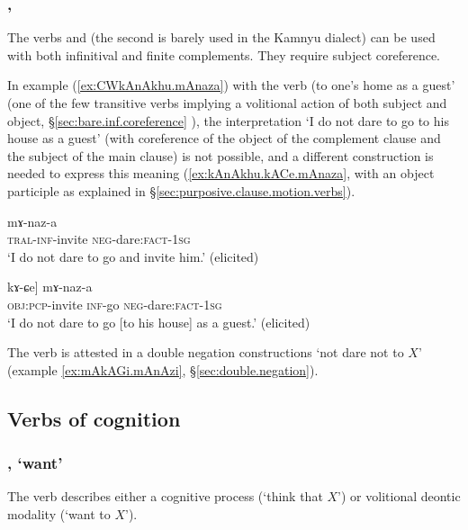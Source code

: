  \subsubsection{, }  \label{sec:nAz.verb}
 The verbs  and  (the second is barely used in the Kamnyu dialect) can be used with both infinitival and finite complements. They require subject coreference. 
 
 
In example (\ref{ex:CWkAnAkhu.mAnaza})  with the verb  (to one's home as a guest' (one of the few transitive verbs implying a volitional action of both subject and object, §\ref{sec:bare.inf.coreference} ), the interpretation `I do not dare to go to his house as a guest' (with coreference of the object of the complement clause and the subject of the main clause) is not possible, and a different construction is needed to express this meaning (\ref{ex:kAnAkhu.kACe.mAnaza}, with an object participle as explained in §\ref{sec:purposive.clause.motion.verbs}).

\begin{exe}
\ex \label{ex:CWkAnAkhu.mAnaza}
\gll  [ɕɯ-kɤ-nɤkʰu] mɤ-naz-a \\
\textsc{tral}-\textsc{inf}-invite \textsc{neg}-dare:\textsc{fact}-\textsc{1sg} \\
\glt `I do not dare to go and invite him.' (elicited)
\end{exe}


\begin{exe}
\ex \label{ex:kAnAkhu.kACe.mAnaza}
\gll [[kɤ-nɤkʰu] kɤ-ɕe] mɤ-naz-a \\
\textsc{obj}:\textsc{pcp}-invite \textsc{inf}-go \textsc{neg}-dare:\textsc{fact}-\textsc{1sg} \\
\glt `I do not dare to go [to his house] as a guest.' (elicited)
\end{exe}

The verb  is attested in a double negation constructions `not dare not to $X$' (example \ref{ex:mAkAGi.mAnAzi}, §\ref{sec:double.negation}).

 \subsection{Verbs of cognition}

 \subsubsection{, `want'} \label{sec:sWso.complement}
 The verb  describes either a cognitive process (`think that $X$') or volitional deontic modality (`want to $X$').

